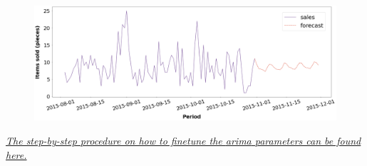 \begin{figure}[h]
  \centering
  \includegraphics[width=0.9\linewidth]{external_content/graphs/final_arima_forecast.png}
  \captionsetup{justification=centering}
  \label{fig:arima_forecast}
\end{figure}

\vspace*{-8mm}
\begin{center}
\textit{\href{\finalARIMAurl}{The step-by-step procedure on how to finetune the \acrshort{arima} parameters can be found here.}}
\end{center}
